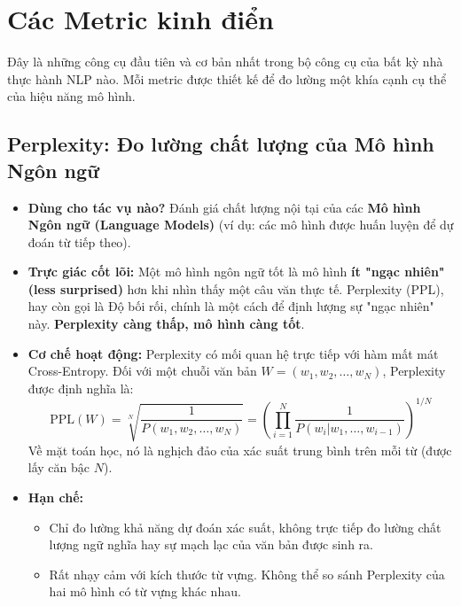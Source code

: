 

\section{Các Metric kinh điển}
\label{sec:classic_metrics}

Đây là những công cụ đầu tiên và cơ bản nhất trong bộ công cụ của bất kỳ nhà thực hành NLP nào. Mỗi metric được thiết kế để đo lường một khía cạnh cụ thể của hiệu năng mô hình.

\subsection{Perplexity: Đo lường chất lượng của Mô hình Ngôn ngữ}
\label{ssec:perplexity}
\begin{itemize}
    \item \textbf{Dùng cho tác vụ nào?} Đánh giá chất lượng nội tại của các \textbf{Mô hình Ngôn ngữ (Language Models)} (ví dụ: các mô hình được huấn luyện để dự đoán từ tiếp theo).
    \item \textbf{Trực giác cốt lõi:} Một mô hình ngôn ngữ tốt là mô hình \textbf{ít "ngạc nhiên" (less surprised)} hơn khi nhìn thấy một câu văn thực tế. Perplexity (PPL), hay còn gọi là Độ bối rối, chính là một cách để định lượng sự "ngạc nhiên" này. \textbf{Perplexity càng thấp, mô hình càng tốt}.
    \item \textbf{Cơ chế hoạt động:} Perplexity có mối quan hệ trực tiếp với hàm mất mát Cross-Entropy. Đối với một chuỗi văn bản $W = (w_1, w_2, \dots, w_N)$, Perplexity được định nghĩa là:
        \begin{equation}
            \text{PPL}(W) = \sqrt[N]{\frac{1}{P(w_1, w_2, \dots, w_N)}} = \left( \prod_{i=1}^{N} \frac{1}{P(w_i|w_1, \dots, w_{i-1})} \right)^{1/N}
            \label{eq:perplexity}
        \end{equation}
        Về mặt toán học, nó là nghịch đảo của xác suất trung bình trên mỗi từ (được lấy căn bậc $N$).
    \item \textbf{Hạn chế:}
        \begin{itemize}
            \item Chỉ đo lường khả năng dự đoán xác suất, không trực tiếp đo lường chất lượng ngữ nghĩa hay sự mạch lạc của văn bản được sinh ra.
            \item Rất nhạy cảm với kích thước từ vựng. Không thể so sánh Perplexity của hai mô hình có từ vựng khác nhau.
        \end{itemize}
\end{itemize}

